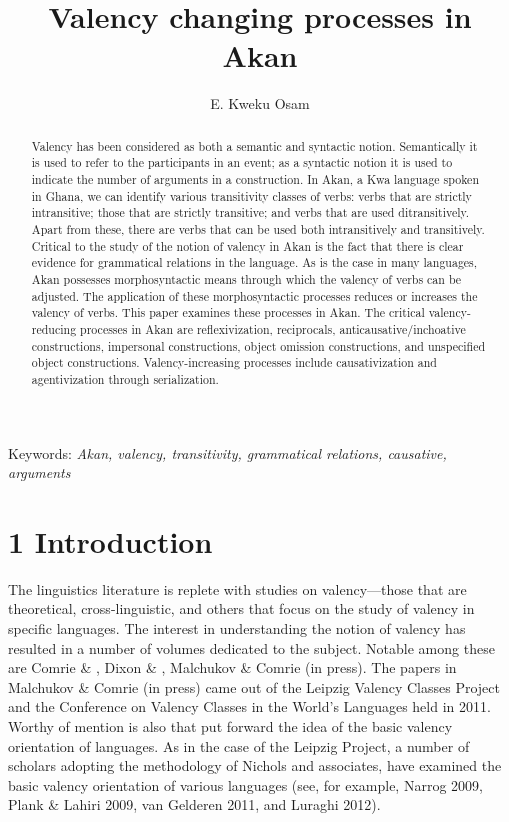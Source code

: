 \documentclass[output=paper]{langsci/langscibook}
\title{Valency changing processes in {Akan} }
\author{%
E. Kweku Osam\affiliation{University of Ghana} 
}
\begin{document}
\begin{abstract}
Valency has been considered as both a semantic and syntactic notion. Semantically it is used to refer to the participants in an event; as a syntactic notion it is used to indicate the number of arguments in a construction. In Akan, a Kwa language spoken in Ghana, we can identify various transitivity classes of verbs: verbs that are strictly intransitive; those that are strictly transitive; and verbs that are used ditransitively. Apart from these, there are verbs that can be used both intransitively and transitively. Critical to the study of the notion of valency in Akan is the fact that there is clear evidence for grammatical relations in the language. As is the case in many languages, Akan possesses morphosyntactic means through which the valency of verbs can be adjusted. The application of these morphosyntactic processes reduces or increases the valency of verbs. This paper examines these processes in Akan. The critical valency-reducing processes in Akan are reflexivization, reciprocals, anticausative/inchoative constructions, impersonal constructions, object omission constructions, and unspecified object constructions. Valency-increasing processes include causativization and agentivization through serialization.
\end{abstract}

Keywords: \emph{Akan, valency, transitivity, grammatical relations, causative, arguments}

\chapter{1 Introduction}
\begin{styleBodyTextIndent}
The linguistics literature is replete with studies on valency—those that are theoretical, cross-linguistic, and others that focus on the study of valency in specific languages. The interest in understanding the notion of valency has resulted in a number of volumes dedicated to the subject. Notable among these are Comrie \& \citet{Polinsky1993}, Dixon \& \citet{Aikhenvald2000a}, Malchukov \& Comrie (in press). The papers in Malchukov \& Comrie (in press) came out of the Leipzig Valency Classes Project and the Conference on Valency Classes in the World's Languages held in 2011. Worthy of mention is also \citet{NicholsEtAl2004} that put forward the idea of the basic valency orientation of languages. As in the case of the Leipzig Project, a number of scholars adopting the methodology of Nichols and associates, have examined the basic valency orientation of various languages (see, for example, Narrog 2009, Plank \& Lahiri 2009, van Gelderen 2011, and Luraghi 2012).  
\end{styleBodyTextIndent}
\end{document}
